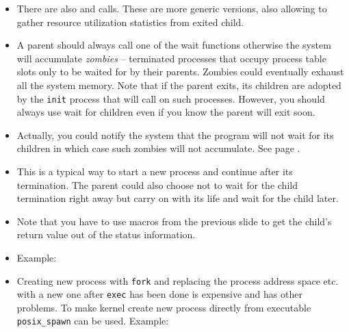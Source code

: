 \begin{itemize}
\item There are also  and  calls. These are more
generic versions, also allowing to gather resource utilization statistics from
exited child.
\item A parent should always call one of the wait functions otherwise the system
will accumulate \emph{zombies} -- terminated processes that occupy process table
slots only to be waited for by their parents.  Zombies could eventually exhaust
all the system memory.  Note that if the parent exits, its children are adopted
by the \texttt{init} process that will call  on such processes.
However, you should always use wait for children even if you know the parent
will exit soon.
\item Actually, you could notify the system that the program will not wait for
its children in which case such zombies will not accumulate.  See page
\pageref{IGNORE_SIG_CHLD}.
\end{itemize}


\begin{slide}
\begin{center}

\end{center}
\end{slide}

\begin{itemize}
\item This is a typical way to start a new process and continue after its
termination.  The parent could also choose not to wait for the child termination
right away but carry on with its life and wait for the child later.
\item Note that you have to use macros from the previous slide to get the
child's return value out of the status information.
\item \label{WAITPID} Example: 
\item \label{SPAWN} Creating new process with \texttt{fork} and replacing the
process address space etc. with a new one after \texttt{exec} has been done is
expensive and has other problems. To make kernel create new process directly
from executable \texttt{posix\_spawn} can be used.
Example: 
\end{itemize}


\label{PIPEREADWRITE}


